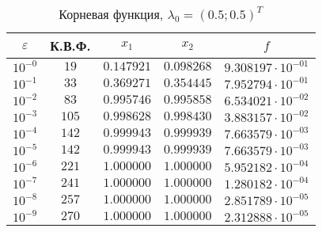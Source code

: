 \documentclass[a4paper,12pt,notitlepage,pdftex,headsepline]{scrartcl}
\begin{document}
        \begin{table}[ht]
          \centering
          \caption{Корневая функция, $\lambda_0 = (0.5; 0.5)^T$}
          \begin{tabular}{|c|c|c|c|c|}
            \hline
            $\varepsilon$ & К.В.Ф. & $x_1$ & $x_2$ & $f$\\
            \hline
            $10^{-0}$ & $19$ & $0.147921$ & $0.098268$ & $9.308197\cdot 10^{-01}$\\
            $10^{-1}$ & $33$ & $0.369271$ & $0.354445$ & $7.952794\cdot 10^{-01}$\\
            $10^{-2}$ & $83$ & $0.995746$ & $0.995858$ & $6.534021\cdot 10^{-02}$\\
            $10^{-3}$ & $105$ & $0.998628$ & $0.998430$ & $3.883157\cdot 10^{-02}$\\
            $10^{-4}$ & $142$ & $0.999943$ & $0.999939$ & $7.663579\cdot 10^{-03}$\\
            $10^{-5}$ & $142$ & $0.999943$ & $0.999939$ & $7.663579\cdot 10^{-03}$\\
            $10^{-6}$ & $221$ & $1.000000$ & $1.000000$ & $5.952182\cdot 10^{-04}$\\
            $10^{-7}$ & $241$ & $1.000000$ & $1.000000$ & $1.280182\cdot 10^{-04}$\\
            $10^{-8}$ & $257$ & $1.000000$ & $1.000000$ & $2.851789\cdot 10^{-05}$\\
            $10^{-9}$ & $270$ & $1.000000$ & $1.000000$ & $2.312888\cdot 10^{-05}$\\
            \hline
          \end{tabular}
        \end{table}
\end{document}

